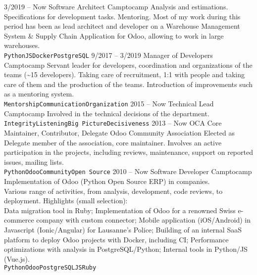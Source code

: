\documentclass[9pt]{developercv} %
\begin{document}
\begin{entrylist}
	\entry
		{3/2019 -- Now}
		{Software Architect}
		{Camptocamp}
		{Analysis and estimations. Specifications for development tasks. Mentoring.
      Most of my work during this period has been as lead architect and
      developer on a Warehouse Management System \& Supply Chain Application for
      Odoo, allowing to work in large warehouses.
      \\
      \texttt{Python}\slashsep\texttt{JS}\slashsep\texttt{Docker}\slashsep\texttt{PostgreSQL}}
	\entry
		{9/2017 -- 3/2019}
		{Manager of Developers}
		{Camptocamp}
		{Servant leader for developers, coordination and organizations of the teams
      (\textasciitilde{}15 developers). Taking care of recruitment, 1:1 with people and taking
      care of them and the production of the teams. Introduction of improvements
      such as a mentoring system.
      \\
      \texttt{Mentorship}\slashsep\texttt{Communication}\slashsep\texttt{Organization}}
	\entry
		{2015 -- Now}
		{Technical Lead}
		{Camptocamp}
		{Involved in the technical decisions of the department.
      \\ \texttt{Integrity}\slashsep\texttt{Listening}\slashsep\texttt{Big Picture}\slashsep\texttt{Decisiveness}}
	\entry
		{2013 -- Now}
		{OCA Core Maintainer, Contributor, Delegate}
		{Odoo Community Association}
		{Elected as Delegate member of the association, core maintainer.
      Involves an active participation in the projects, including
      reviews, maintenance, support on reported issues, mailing lists. \\
      \texttt{Python}\slashsep\texttt{Odoo}\slashsep\texttt{Community}\slashsep\texttt{Open Source}}
	\entry
		{2010 -- Now}
		{Software Developer}
		{Camptocamp}
		{Implementation of Odoo (Python Open Source ERP) in companies.\\
      Various range of activities, from analysis, development, code reviews, to deployment.
      Highlights (small selection): \\
      Data migration tool in Ruby; Implementation of Odoo for a renowned Swiss
      e-commerce company with custom connector; Mobile application (iOS/Android)
      in Javascript (Ionic/Angular) for Lausanne's Police; Building of an
      internal SaaS platform to deploy Odoo projects with Docker, including CI;
      Performance optimizations with analysis in PostgreSQL/Python;
      Internal tools in Python/JS (Vue.js). \\
      \texttt{Python}\slashsep\texttt{Odoo}\slashsep\texttt{PostgreSQL}\slashsep\texttt{JS}\slashsep\texttt{Ruby}}

\end{entrylist}
\end{document}
